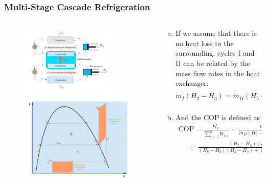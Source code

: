 \documentclass[10pt,compress]{beamer}
\newcommand{\frc}{\displaystyle\frac}
\begin{document}
\begin{frame}
 \frametitle{Multi-Stage Cascade Refrigeration}
 \begin{columns}
  \begin{column}[c]{0.35\linewidth}
   \begin{figure}%
     \vbox{
      \includegraphics[width=4.5cm,height=3.5cm,clip]{./Pics/Overview_Refrig24}
      \vspace{-.1cm}
      \includegraphics[width=4.cm,height=4.cm,clip]{./Pics/Overview_Refrig25}}
   \end{figure}  
  \end{column}  
  \begin{column}[c]{0.65\linewidth}
   \begin{enumerate}[(a)]
    \item <1-> If we assume that there is no heat loss to the surrounding, cycles \textcolor{red}{I} and \textcolor{red}{II} can be related by the mass flow rates in the heat exchanger:
      \begin{displaymath}
       \dot{m}_{I}\left(H_{2}-H_{3}\right)=\dot{m}_{II}\left(H_{5}-H_{8}\right)\Rightarrow \frc{\dot{m}_{I}}{\dot{m}_{II}}=\frc{H_{5}-H_{8}}{H_{2}-H_{3}}
      \end{displaymath}
    \item <2-> And the COP is defined as
     \begin{eqnarray}
      \text{COP}= \frc{Q_{L}}{\sum\limits_{i=1}^{2}W_{c,i}} = \frc{\dot{m}_{I}\left(H_{1}-H_{4}\right)}{\dot{m}_{II}\left(H_{6}-H_{5}\right)+\dot{m}_{I}\left(H_{2}-H_{1}\right)}\nonumber\\
            \;\;\;\;\;= \frc{\left(H_{5}-H_{8}\right)\left(H_{1}-H_{4}\right)}{\left(H_{6}-H_{5}\right)\left(H_{2}-H_{3}\right)+\left(H_{5}-H_{8}\right)\left(H_{2}-H_{1}\right)}
     \end{eqnarray}
   \end{enumerate}
  \end{column}  
 \end{columns} 
\end{frame}
\end{document}
